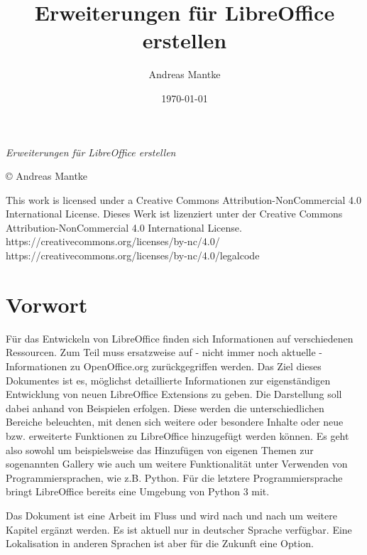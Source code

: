 \documentclass[a4paper,10pt,pagesize,titlepage]{scrbook}
\author{Andreas Mantke}
\title{Erweiterungen für LibreOffice erstellen}
\date{\today}
\begin{document}
 


\maketitle
 \setcounter{tocdepth}{10}


\begin{flushleft}
	
	\textit{Erweiterungen für LibreOffice erstellen}
	
	© Andreas Mantke 
	
	
	\noindent This work is licensed under a Creative Commons Attribution-NonCommercial 4.0 International License. Dieses Werk ist lizenziert unter der Creative Commons Attribution-NonCommercial 4.0 International License.
	https://creativecommons.org/licenses/by-nc/4.0/
	https://creativecommons.org/licenses/by-nc/4.0/legalcode
\end{flushleft}


\tableofcontents
\listoffigures

\chapter*{Vorwort}

Für das Entwickeln von LibreOffice finden sich Informationen auf verschiedenen Ressourcen. Zum Teil muss ersatzweise auf - nicht immer noch aktuelle - Informationen zu OpenOffice.org zurückgegriffen werden. Das Ziel dieses Dokumentes ist es, möglichst detaillierte Informationen zur eigenständigen Entwicklung von neuen LibreOffice Extensions zu geben. Die Darstellung soll dabei anhand von Beispielen erfolgen. Diese werden die unterschiedlichen Bereiche beleuchten, mit denen sich weitere oder besondere Inhalte oder neue bzw. erweiterte Funktionen zu LibreOffice hinzugefügt werden können. Es geht also sowohl um beispielsweise das Hinzufügen von eigenen Themen zur sogenannten Gallery wie auch um weitere Funktionalität unter Verwenden von Programmiersprachen, wie z.B. Python. Für die letztere Programmiersprache bringt LibreOffice bereits eine Umgebung von Python 3 mit.

Das Dokument ist eine Arbeit im Fluss und wird nach und nach um weitere Kapitel ergänzt werden. Es ist aktuell nur in deutscher Sprache verfügbar. Eine Lokalisation in anderen Sprachen ist aber für die Zukunft eine Option.
\end{document}
